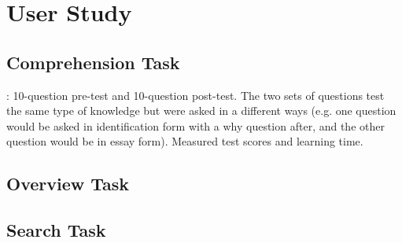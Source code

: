 \section{User Study}
\subsection{Comprehension Task}
\cite{monserrat2014live}: 10-question pre-test and 10-question post-test. The two sets of questions test the same type of knowledge but were asked in a different ways (e.g. one question would be asked in identification form with a why question after, and the other question would be in essay form). Measured test scores and learning time.
\subsection{Overview Task}
\subsection{Search Task}